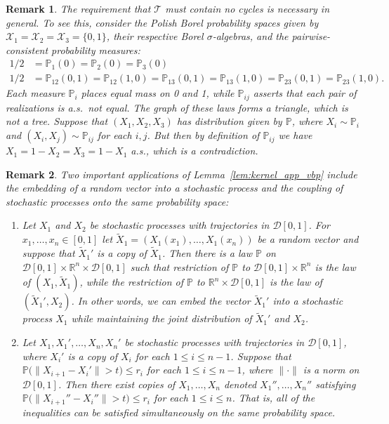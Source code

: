 \documentclass[11pt,lof]{puthesis}
\renewcommand{\P}{\ensuremath{\mathbb{P}}}
\newcommand{\R}{\ensuremath{\mathbb{R}}}
\newcommand{\cX}{\ensuremath{\mathcal{X}}}
\newcommand{\cT}{\ensuremath{\mathcal{T}}}
\newcommand{\cD}{\ensuremath{\mathcal{D}}}
\theoremstyle{break}
\newtheorem{remark}{Remark}[section]
\theoremstyle{proof}
\begin{document}
\begin{remark}
The requirement that $\cT$ must contain no cycles
is necessary in general.
To see this, consider the Polish Borel probability spaces
given by
$\cX_1 = \cX_2 = \cX_3 = \{0,1\}$,
their respective Borel $\sigma$-algebras,
and the pairwise-consistent probability measures:
%
\begin{align*}
1/2
&=
\P_1(0) = \P_2(0) = \P_3(0) \\
1/2
&=
\P_{12}(0,1) = \P_{12}(1,0) =
\P_{13}(0,1) = \P_{13}(1,0) =
\P_{23}(0,1) = \P_{23}(1,0).
\end{align*}
%
Each measure $\P_i$ places equal mass on 0 and 1, while $\P_{i j}$
asserts that each pair of realizations is a.s.\ not equal.
The graph of these laws forms a triangle,
which is not a tree.
Suppose that $(X_1,X_2,X_3)$ has distribution given by $\P$,
where $X_i \sim \P_i$ and $(X_i,X_j) \sim \P_{i j}$
for each $i,j$.
But then by definition of $\P_{i j}$ we have
$X_1 = 1-X_2 = X_3 = 1-X_1$ a.s.,
which is a contradiction.

\end{remark}

\begin{remark}

Two important applications of
Lemma~\ref{lem:kernel_app_vbp} include
the embedding of a random vector into a stochastic process
and the coupling of stochastic processes
onto the same probability space:
%
\begin{enumerate}[label=(\roman*)]

\item
Let $X_1$ and $X_2$
be stochastic processes with
trajectories in $\cD[0,1]$.
For $x_1, \ldots, x_n \in [0,1]$
let $\tilde X_1 = (X_1(x_1), \ldots, X_1(x_n))$
be a random vector
and suppose that $\tilde X_1'$
is a copy of $\tilde X_1$.
Then there is a law $\P$ on
$\cD[0,1] \times \R^n \times \cD[0,1]$
such that restriction of $\P$ to
$\cD[0,1] \times \R^n$
is the law of $(X_1, \tilde X_1)$,
while the restriction of $\P$ to
$\R^n \times \cD[0,1]$
is the law of $(\tilde X_1',X_2)$.
In other words,
we can embed the vector $\tilde X_1'$
into a stochastic process $X_1$
while maintaining the joint distribution of
$\tilde X_1'$ and $X_2$.

\item
Let $X_1, X_1', \ldots, X_n, X_n'$
be stochastic processes with
trajectories in $\cD[0,1]$,
where $X_i'$ is a copy of $X_i$
for each $1 \leq i \leq n-1$.
Suppose that
$\P\big(\|X_{i+1} - X_i'\| > t)\leq r_i$
for each $1 \leq i \leq n-1$,
where $\|\cdot\|$ is a norm on $\cD[0,1]$.
Then there exist copies of
$X_1, \ldots, X_n$
denoted
$X_1'', \ldots, X_n''$
satisfying
$\P\big(\|X_{i+1}'' - X_i''\| > t)\leq r_i$
for each $1 \leq i \leq n$.
That is, all of the inequalities
can be satisfied simultaneously
on the same probability space.

\end{enumerate}

\end{remark}
\end{document}
